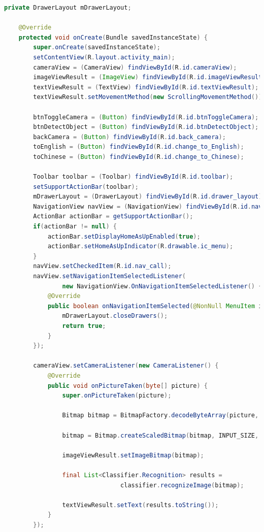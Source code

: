 \documentclass[UTF8, Microsoft YaHei]{book}
\begin{document}
\begin{small}
\begin{lstlisting}[language=java]
    private DrawerLayout mDrawerLayout;

    @Override
    protected void onCreate(Bundle savedInstanceState) {
        super.onCreate(savedInstanceState);
        setContentView(R.layout.activity_main);
        cameraView = (CameraView) findViewById(R.id.cameraView);
        imageViewResult = (ImageView) findViewById(R.id.imageViewResult);
        textViewResult = (TextView) findViewById(R.id.textViewResult);
        textViewResult.setMovementMethod(new ScrollingMovementMethod());

        btnToggleCamera = (Button) findViewById(R.id.btnToggleCamera);
        btnDetectObject = (Button) findViewById(R.id.btnDetectObject);
        backCamera = (Button) findViewById(R.id.back_camera);
        toEnglish = (Button) findViewById(R.id.change_to_English);
        toChinese = (Button) findViewById(R.id.change_to_Chinese);

        Toolbar toolbar = (Toolbar) findViewById(R.id.toolbar);
        setSupportActionBar(toolbar);
        mDrawerLayout = (DrawerLayout) findViewById(R.id.drawer_layout);
        NavigationView navView = (NavigationView) findViewById(R.id.nav_view);
        ActionBar actionBar = getSupportActionBar();
        if(actionBar != null) {
            actionBar.setDisplayHomeAsUpEnabled(true);
            actionBar.setHomeAsUpIndicator(R.drawable.ic_menu);
        }
        navView.setCheckedItem(R.id.nav_call);
        navView.setNavigationItemSelectedListener(
        		new NavigationView.OnNavigationItemSelectedListener() {
            @Override
            public boolean onNavigationItemSelected(@NonNull MenuItem item) {
                mDrawerLayout.closeDrawers();
                return true;
            }
        });

        cameraView.setCameraListener(new CameraListener() {
            @Override
            public void onPictureTaken(byte[] picture) {
                super.onPictureTaken(picture);

                Bitmap bitmap = BitmapFactory.decodeByteArray(picture, 0, picture.length);

                bitmap = Bitmap.createScaledBitmap(bitmap, INPUT_SIZE, INPUT_SIZE, false);

                imageViewResult.setImageBitmap(bitmap);

                final List<Classifier.Recognition> results =
                				classifier.recognizeImage(bitmap);

                textViewResult.setText(results.toString());
            }
        });


\end{lstlisting}
\end{small}
\end{document}
